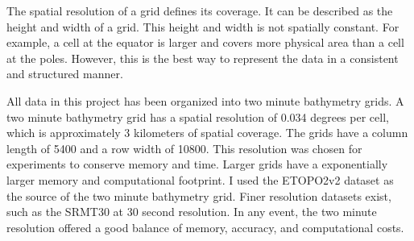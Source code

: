 \par
The spatial resolution of a grid defines its coverage.
It can be described as the height and width of a grid.
This height and width is not spatially constant.
For example, a cell at the equator is larger and covers more physical area than a cell at the poles.
However, this is the best way to represent the data in a consistent and structured manner.

\par
All data in this project has been organized into two minute bathymetry grids.
A two minute bathymetry grid has a spatial resolution of 0.034 degrees per cell, which is approximately 3 kilometers of spatial coverage.
The grids have a column length of 5400 and a row width of 10800.
This resolution was chosen for experiments to conserve memory and time.
Larger grids have a exponentially larger memory and computational footprint.
I used the \ac{ETOPO}2v2 \cite{national1988etopo} dataset as the source of the two minute bathymetry grid.
Finer resolution datasets exist, such as the SRMT30 \cite{becker2009global} at 30 second resolution.
In any event, the two minute resolution offered a good balance of memory, accuracy, and computational costs.










